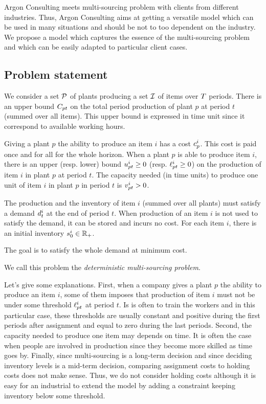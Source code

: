 Argon Consulting meets multi-sourcing problem with clients from different industries.
Thus, Argon Consulting aims at getting a versatile model which can be used in many situations and should be not to too dependent on the industry.
We propose a model which captures the essence of the multi-sourcing problem and which can be easily adapted to particular client cases.


\subsection{Problem statement}
\label{sec:multi-sourcing:deterministic:introduction:problem_statement}


We consider a set $\mathcal{P}$ of plants producing a set $\mathcal{I}$ of items over $T$ periods.
There is an upper bound $C_{pt}$ on the total period production of plant $p$ at period $t$ (summed over all items).
This upper bound is expressed in time unit since it correspond to available working hours.


Giving a plant $p$ the ability to produce an item $i$ has a cost $c_p^i$.
This cost is paid once and for all for the whole horizon.
When a plant $p$ is able to produce item $i$, there is an upper (resp. lower) bound $u_{pt}^i\ge 0$ (resp. $\ell_{pt}^i\ge 0$) on the production of item $i$ in plant $p$ at period $t$.
The capacity needed (in time units) to produce one unit of item $i$ in plant $p$ in period $t$ is $v_{pt}^i>0$.


The production and the inventory of item $i$ (summed over all plants) must satisfy a demand $d_t^i$ at the end of period $t$.
When production of an item $i$ is not used to satisfy the demand, it can be stored and incurs no cost.
For each item $i$, there is an initial inventory $s_0^i\in\mathbb{R}_+$.


The goal is to satisfy the whole demand at minimum cost.


We call this problem the \emph{deterministic multi-sourcing problem}.


\medskip


Let's give some explanations.
First, when a company gives a plant $p$ the ability to produce an item $i$, some of them imposes that production of item $i$ must not be under some threshold $\ell_{pt}^i$ at period $t$.
Is is often to train the workers and in this particular case, these thresholds are usually constant and positive during the first periods after assignment and equal to zero during the last periods.
Second, the capacity needed to produce one item may depends on time.
It is often the case when people are involved in production since they become more skilled as time goes by.
Finally, since multi-sourcing is a long-term decision and since deciding inventory levels is a mid-term decision, comparing assignment costs to holding costs does not make sense.
Thus, we do not consider holding costs although it is easy for an industrial to extend the model by adding a constraint keeping inventory below some threshold.



